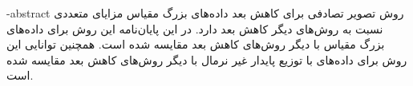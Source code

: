
\fa-abstract{
روش تصویر تصادفی برای کاهش بعد داده‌های بزرگ مقیاس مزایای متعددی نسبت به روش‌های دیگر کاهش بعد دارد. در این پایان‌نامه این روش برای داده‌های بزرگ مقیاس با دیگر روش‌های کاهش بعد مقایسه شده است. همچنین توانایی این روش برای داده‌های با توزیع پایدار غیر نرمال با دیگر روش‌های کاهش بعد مقایسه شده است.
}





\AUTtitle
